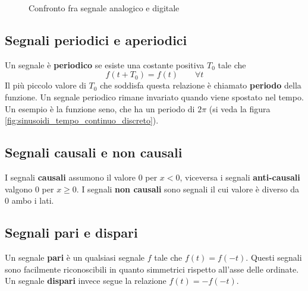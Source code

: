 \documentclass[a4paper, titlepage, oneside]{scrbook}
\begin{document}
\begin{figure}[h]
	\centering
\caption{Confronto fra segnale analogico e digitale}
\label{fig:analogico_vs_digitale}
\end{figure}

\subsection{Segnali periodici e aperiodici}
Un segnale è \textbf{periodico} se esiste una costante positiva $T_{0}$ tale che
$$
	f(t+T_{0})=f(t) \qquad \forall t
$$
Il più piccolo valore di $T_{0}$ che soddisfa questa relazione è chiamato \textbf{periodo} della funzione. Un segnale periodico rimane invariato quando viene spostato
nel tempo. Un esempio è la funzione seno, che ha un periodo di $2\pi$ (si veda la figura \ref{fig:sinusoidi_tempo_continuo_discreto}).

\subsection{Segnali causali e non causali}
I segnali \textbf{causali} assumono il valore $0$ per $x<0$, viceversa i segnali \textbf{anti-causali} valgono $0$ per $x\geq0$.
I segnali \textbf{non causali} sono segnali il cui valore è diverso da $0$ ambo i lati.

\subsection{Segnali pari e dispari}
Un segnale \textbf{pari} è un qualsiasi segnale $f$ tale che $f(t)=f(-t)$. Questi segnali sono facilmente riconoscibili in quanto simmetrici rispetto all'asse delle ordinate.
Un segnale \textbf{dispari} invece segue la relazione $f(t)=-f(-t)$.
\end{document}
